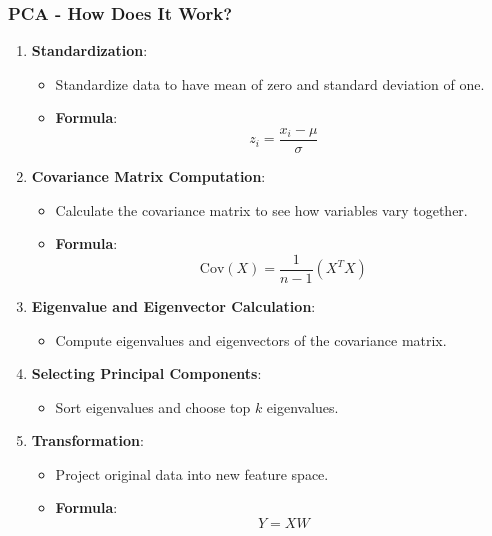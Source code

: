 \documentclass[aspectratio=169]{beamer}
\begin{document}
\begin{frame}[fragile]
  \frametitle{PCA - How Does It Work?}
  \begin{enumerate}
    \item \textbf{Standardization}:
      \begin{itemize}
        \item Standardize data to have mean of zero and standard deviation of one.
        \item \textbf{Formula}: 
        \[
        z_i = \frac{x_i - \mu}{\sigma}
        \]
      \end{itemize}
      
    \item \textbf{Covariance Matrix Computation}:
      \begin{itemize}
        \item Calculate the covariance matrix to see how variables vary together.
        \item \textbf{Formula}: 
        \[
        \text{Cov}(X) = \frac{1}{n-1} (X^T X)
        \]
      \end{itemize}
      
    \item \textbf{Eigenvalue and Eigenvector Calculation}:
      \begin{itemize}
        \item Compute eigenvalues and eigenvectors of the covariance matrix.
      \end{itemize}
      
    \item \textbf{Selecting Principal Components}:
      \begin{itemize}
        \item Sort eigenvalues and choose top \( k \) eigenvalues.
      \end{itemize}
      
    \item \textbf{Transformation}:
      \begin{itemize}
        \item Project original data into new feature space.
        \item \textbf{Formula}:
        \[
        Y = XW
        \]
      \end{itemize}
  \end{enumerate}
\end{frame}
\end{document}
